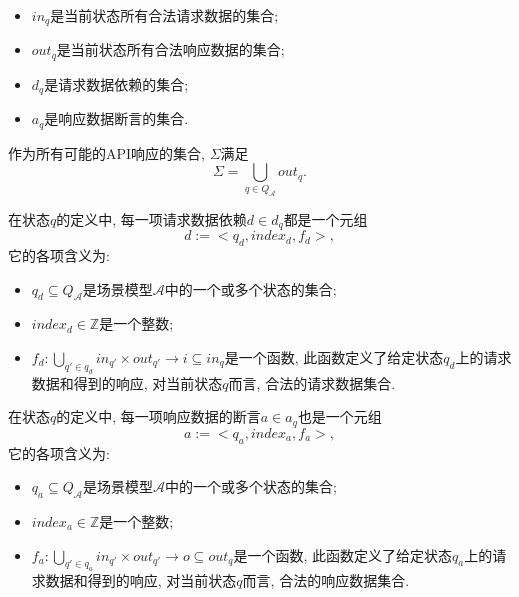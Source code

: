 \begin{definition}
\begin{itemize}
                \item $in_q$是当前状态所有合法请求数据的集合;
                
                \item $out_q$是当前状态所有合法响应数据的集合;
                
                \item $d_q$是请求数据依赖的集合;
                
                \item $a_q$是响应数据断言的集合.
            \end{itemize}
            
            作为所有可能的API响应的集合, $\Sigma$满足
            \begin{equation}
                \Sigma = \bigcup_{q \in Q_{\mathcal{A}}} out_q.
            \end{equation}
            
            在状态$q$的定义中, 每一项请求数据依赖$d \in d_q$都是一个元组
            \begin{equation}
                \label{eq:scenario_request_depen}
                d := <q_d, index_d, f_d>,
            \end{equation}
            它的各项含义为:
            \begin{itemize}
                \item $q_d \subseteq Q_{\mathcal{A}}$是场景模型$\mathcal{A}$中的一个或多个状态的集合;
                
                \item $index_d \in \mathbb{Z}$是一个整数;
                
                \item $f_d: \bigcup_{q' \in q_d} in_{q'} \times out_{q'} \to i \subseteq in_q$是一个函数, 此函数定义了给定状态$q_d$上的请求数据和得到的响应, 对当前状态$q$而言, 合法的请求数据集合.
            \end{itemize}
            
            在状态$q$的定义中, 每一项响应数据的断言$a \in a_q$也是一个元组
            \begin{equation}
                a := <q_a, index_a, f_a>,
            \end{equation}
            它的各项含义为:
            \begin{itemize}
                \item $q_a \subseteq Q_{\mathcal{A}}$是场景模型$\mathcal{A}$中的一个或多个状态的集合;
                
                \item $index_a \in \mathbb{Z}$是一个整数;
                
                \item $f_a: \bigcup_{q' \in q_a} in_{q'} \times out_{q'} \to o \subseteq out_q$是一个函数, 此函数定义了给定状态$q_a$上的请求数据和得到的响应, 对当前状态$q$而言, 合法的响应数据集合.
            \end{itemize}
        \end{definition}
        
